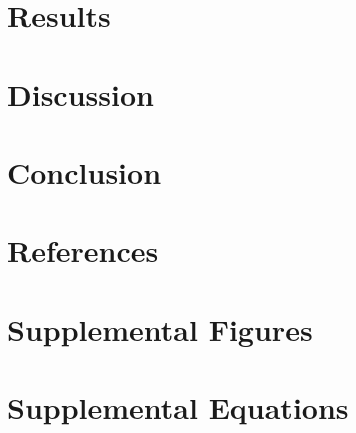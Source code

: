 \documentclass[review,3p,authoryear]{elsarticle}
\begin{document}
\section{Results}\label{s:results}

\section{Discussion}\label{s:discussion}
%
\section{Conclusion}\label{s:conclusion}
%
\clearpage
\section{References}

\appendix\setcounter{figure}{0}\clearpage
\color{black}
\section{Supplemental Figures}\label{a:figs}

\section{Supplemental Equations}\label{a:eqs}

\end{document}
